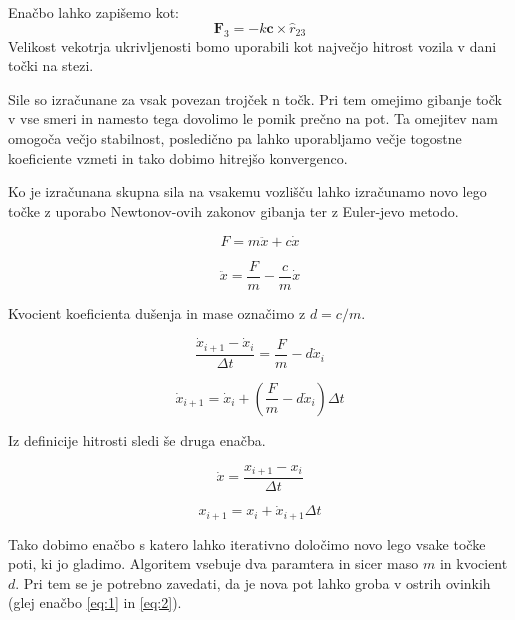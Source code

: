 \documentclass[10pt,a4paper]{article}
\begin{document}
Enačbo lahko zapišemo kot:
\begin{equation}
\mathbf{F}_3 = -k \mathbf{c} \times \hat{r}_{23}
\end{equation}
Velikost vekotrja ukrivljenosti bomo uporabili kot največjo hitrost vozila v dani točki na stezi.

Sile so izračunane za vsak povezan trojček n točk. Pri tem omejimo gibanje točk v vse smeri in namesto tega dovolimo le pomik prečno na pot. Ta omejitev nam omogoča večjo stabilnost, posledično pa lahko uporabljamo večje togostne koeficiente vzmeti in tako dobimo hitrejšo konvergenco.

Ko je izračunana skupna sila na vsakemu vozlišču lahko izračunamo novo lego točke z uporabo Newtonov-ovih zakonov gibanja ter z Euler-jevo metodo.

\begin{equation}
F = m \ddot{x} + c \dot{x}
\end{equation}

\begin{equation}
\ddot{x} = \frac{F}{m} - \frac{c}{m} \dot{x}
\end{equation}

Kvocient koeficienta dušenja in mase označimo z $d = c / m$.

\begin{equation}
\frac{\dot{x}_{i+1} - \dot{x}_i}{\Delta t} = \frac{F}{m} - d \dot{x}_i
\end{equation}

\begin{equation}
\dot{x}_{i+1} = \dot{x}_i + (\frac{F}{m} - d \dot{x}_i)\Delta t
\end{equation}

Iz definicije hitrosti sledi še druga enačba.

\begin{equation}
\dot{x} = \frac{x_{i+1} - x_i}{\Delta t}
\end{equation}

\begin{equation} \label{eq:16}
x_{i + 1} = x_{i} + \dot{x}_{i + 1} \Delta t 
\end{equation}

Tako dobimo enačbo s katero lahko iterativno določimo novo lego vsake točke poti, ki jo gladimo. Algoritem vsebuje dva paramtera in sicer maso $m$ in kvocient $d$. Pri tem se je potrebno zavedati, da je nova pot lahko groba v ostrih ovinkih (glej enačbo \ref{eq:1} in \ref{eq:2}).
\end{document}
